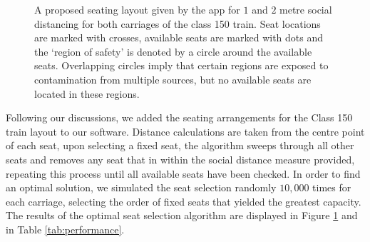 \documentclass[11pt,a4paper]{article}
\begin{document}
\begin{figure}[ht!]
\caption{A proposed seating layout given by the app for $1$ and $2$ metre social distancing for both carriages of the class 150 train. Seat locations are marked with crosses, available seats are marked with dots and the `region of safety' is denoted by a circle around the available seats. Overlapping circles imply that certain regions are exposed to contamination from multiple sources, but no available seats are located in these regions. }
\label{Demonstration_pics}
\end{figure}


Following our discussions, we added the seating arrangements for the Class 150 train layout to our software. Distance calculations are taken from the centre point of each seat, upon selecting a fixed seat, the algorithm sweeps through all other seats and removes any seat that in within the social distance measure provided, repeating this process until all available seats have been checked. In order to find an optimal solution, we simulated the seat selection randomly $10,000$ times for each carriage, selecting the order of fixed seats that yielded the greatest capacity. The results of the optimal seat selection algorithm are displayed in Figure \ref{Demonstration_pics} and in Table \ref{tab:performance}. 
\end{document}
